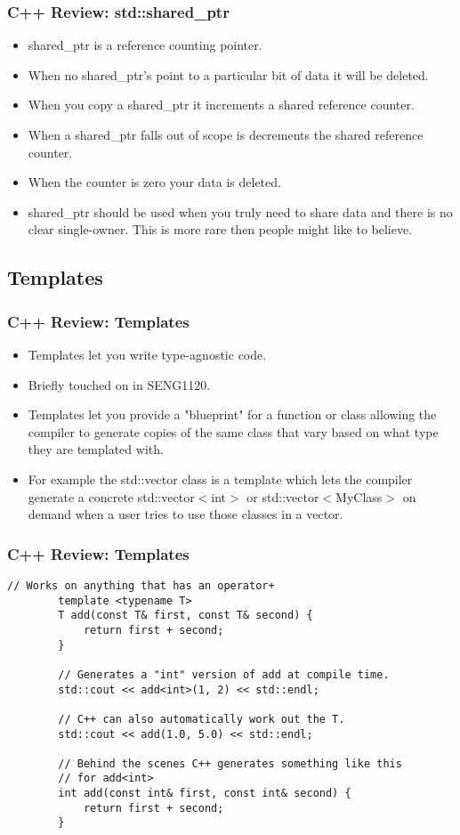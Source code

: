 \documentclass{beamer}
\begin{document}
\begin{frame}[fragile]
	\frametitle{C++ Review: std::shared\_ptr}
	\begin{itemize}
		\item shared\_ptr is a reference counting pointer.
		\item When no shared\_ptr's point to a particular bit of data it will be deleted.
		\item When you copy a shared\_ptr it increments a shared reference counter. 
		\item When a shared\_ptr falls out of scope is decrements the shared reference counter.
		\item When the counter is zero your data is deleted.
		\item shared\_ptr should be used when you truly need to share data and there is no clear single-owner. 
			This is more rare then people might like to believe.
	\end{itemize}
\end{frame}

\subsection{Templates}
\begin{frame}
	\frametitle{C++ Review: Templates}
	\begin{itemize}
		\item Templates let you write type-agnostic code.
		\item Briefly touched on in SENG1120.
		\item Templates let you provide a "blueprint" for a function or class allowing the compiler to generate
			copies of the same class that vary based on what type they are templated with.
		\item For example the std::vector class is a template which lets the compiler generate a concrete
			std::vector$<$int$>$ or std::vector$<$MyClass$>$ on demand when a user tries to use those classes 
			in a vector.
	\end{itemize}
\end{frame}

\begin{frame}[fragile]
	\frametitle{C++ Review: Templates}
	\begin{lstlisting}[language=nuclear]
		// Works on anything that has an operator+
		template <typename T>
		T add(const T& first, const T& second) {
		    return first + second;
		}
		
		// Generates a "int" version of add at compile time.
		std::cout << add<int>(1, 2) << std::endl;

		// C++ can also automatically work out the T.
		std::cout << add(1.0, 5.0) << std::endl;

		// Behind the scenes C++ generates something like this
		// for add<int>
		int add(const int& first, const int& second) {
		    return first + second;
		}
	\end{lstlisting}
\end{frame}
\end{document}
